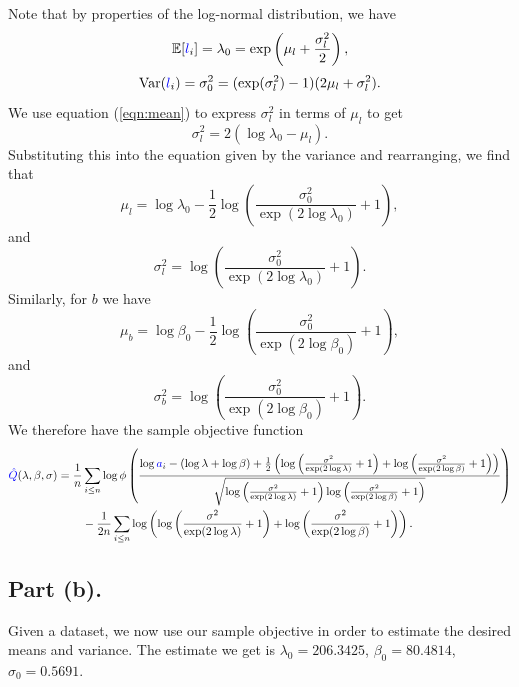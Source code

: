 \documentclass{article}
\renewcommand{\r}[1]{\textcolor{blue}{#1}}
\newcommand{\Var}{\mathrm{Var}}
\newcommand{\E}{\mathbb{E}}
\begin{document}
Note that by properties of the log-normal distribution, we have
\begin{equation}\label{eqn:mean} \E[\r{l}_{i}]=\lambda_{0}=\exp\left(\mu_{l}+\frac{\sigma_{l}^{2}}{2}\right), \end{equation}
\begin{equation} \Var(\r{l}_{i})=\sigma_{0}^{2} =(\exp(\sigma_{l}^{2})-1)(2\mu_{l}+\sigma_{l}^{2}).\end{equation}
We use equation (\ref{eqn:mean}) to express $\sigma_{l}^{2}$ in terms of $\mu_{l}$ to get
\begin{equation} \sigma_{l}^{2} = 2(\log\lambda_{0}-\mu_{l}).\end{equation}
Substituting this into the equation given by the variance and rearranging, we find that
\begin{equation}\mu_{l}=\log\lambda_{0}-\frac{1}{2}\log\left(\frac{\sigma_{0}^{2}}{\exp(2\log\lambda_{0})}+1\right),\end{equation}
and
\begin{equation}\sigma_{l}^{2} = \log\left(\frac{\sigma_{0}^{2}}{\exp(2\log\lambda_{0})}+1\right).\end{equation}
Similarly, for $b$ we have
\begin{equation} \mu_{b} = \log\beta_{0}-\frac{1}{2}\log\left(\frac{\sigma_{0}^{2}}{\exp(2\log\beta_{0})}+1\right),\end{equation}
and
\begin{equation}\sigma_{b}^{2} = \log\left(\frac{\sigma_{0}^{2}}{\exp(2\log\beta_{0})}+1\right).\end{equation}
We therefore have the sample objective function
\begin{equation}\begin{split}
\r{\hat{Q}}(\lambda,\beta,\sigma) = \frac{1}{n}&\sum_{i\leq n}\log{\phi\left(\frac{\log\r{a}_{i}-(\log\lambda+\log\beta)+\frac{1}{2}\left(\log\left(\frac{\sigma^{2}}{\exp(2\log\lambda)}+1\right)+\log\left(\frac{\sigma^{2}}{\exp(2\log\beta)}+1\right)\right)}{\sqrt{\log\left(\frac{\sigma^{2}}{\exp(2\log\lambda)}+1\right)\log\left(\frac{\sigma^{2}}{\exp(2\log\beta)}+1\right)}}\right)}\\
&-\frac{1}{2n}\sum_{i\leq n}\log\left(\log\left(\frac{\sigma^{2}}{\exp(2\log\lambda)}+1\right)+\log\left(\frac{\sigma^{2}}{\exp(2\log\beta)}+1\right)\right).
\end{split}\end{equation}



\subsection{Part (b).}
Given a dataset, we now use our sample objective in order to estimate the desired means and variance. The estimate we get is $\lambda_{0}=206.3425$, $\beta_{0}=80.4814$, $\sigma_{0}=0.5691$.
\end{document}
